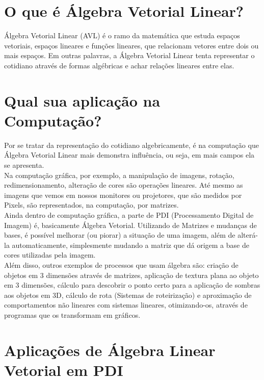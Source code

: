 \documentclass{article}
\begin{document}
    \section{O que é Álgebra Vetorial Linear?}
        Álgebra Vetorial Linear (AVL) é o ramo da matemática que estuda espaços vetoriais, espaços lineares e funções lineares, que relacionam vetores entre dois ou mais espaços. Em outras palavras, a Álgebra Vetorial Linear tenta representar o cotidiano através de formas algébricas e achar relações lineares entre elas.
    
    \section {Qual sua aplicação na Computação?}
        Por se tratar da representação do cotidiano algebricamente, é na computação que Álgebra Vetorial Linear mais demonstra influência, ou seja, em mais campos ela se apresenta.\\        
        Na computação gráfica, por exemplo, a manipulação de imagens, rotação, redimensionamento, alteração de cores são operações lineares. Até mesmo as imagens que vemos em nossos monitores ou projetores, que são medidos por Pixels, são representados, na computação, por matrizes.\\     
        Ainda dentro de computação gráfica, a parte de PDI (Processamento Digital de Imagem) é, basicamente Álgebra Vetorial. Utilizando de Matrizes e mudanças de bases, é possível melhorar (ou piorar) a situação de uma imagem, além de alterá-la automaticamente, simplesmente mudando a matriz que dá origem a base de cores utilizadas pela imagem.\\        
        Além disso, outros exemplos de processos que usam álgebra são: criação de objetos em 3 dimensões através de matrizes, aplicação de textura plana ao objeto em 3 dimensões, cálculo para descobrir o ponto certo para a aplicação de sombras aos objetos em 3D, cálculo de rota (Sistemas de roteirização) e aproximação de comportamentos não lineares com sistemas lineares, otimizando-os, através de programas que os transformam em gráficos.
    
    \section {Aplicações de Álgebra Linear Vetorial em PDI}
        
\end{document}
